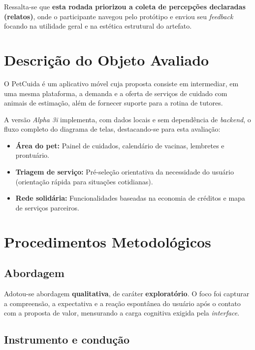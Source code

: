 \documentclass[12pt,a4paper]{article}
\begin{document}
Ressalta-se que \textbf{esta rodada priorizou a coleta de percepções declaradas (relatos)}, onde o participante navegou pelo protótipo e enviou seu \textit{feedback} focando na utilidade geral e na estética estrutural do artefato.

\section{Descrição do Objeto Avaliado}

O PetCuida é um aplicativo móvel cuja proposta consiste em intermediar, em uma mesma plataforma, a demanda e a oferta de serviços de cuidado com animais de estimação, além de fornecer suporte para a rotina de tutores. 

A versão \textit{Alpha 3i} implementa, com dados locais e sem dependência de \textit{backend}, o fluxo completo do diagrama de telas, destacando-se para esta avaliação:

\begin{itemize}[leftmargin=*]
    \item \textbf{Área do pet:} Painel de cuidados, calendário de vacinas, lembretes e prontuário.
    \item \textbf{Triagem de serviço:} Pré-seleção orientativa da necessidade do usuário (orientação rápida para situações cotidianas).
    \item \textbf{Rede solidária:} Funcionalidades baseadas na economia de créditos e mapa de serviços parceiros.
\end{itemize}

\section{Procedimentos Metodológicos}

\subsection{Abordagem}

Adotou-se abordagem \textbf{qualitativa}, de caráter \textbf{exploratório}. O foco foi capturar a compreensão, a expectativa e a reação espontânea do usuário após o contato com a proposta de valor, mensurando a carga cognitiva exigida pela \textit{interface}.

\subsection{Instrumento e condução}
\end{document}
